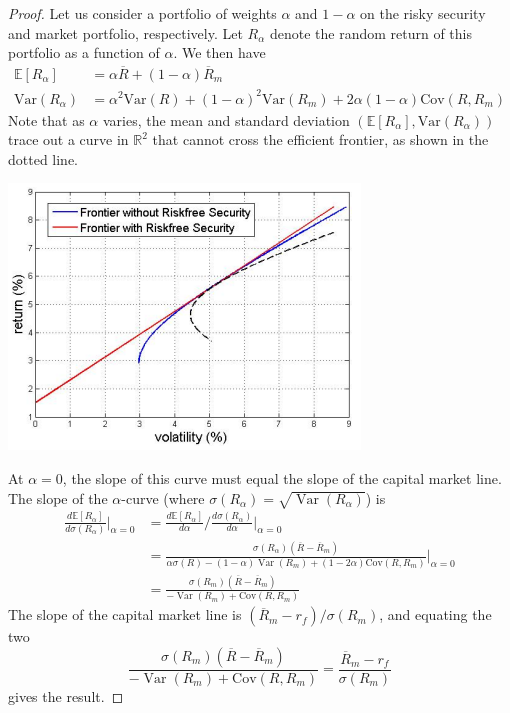 \documentclass{article}
\DeclareMathOperator{\Var}{Var}
\begin{document}
    \begin{proof}
      Let us consider a portfolio of weights $\alpha$ and $1 - \alpha$ on the risky security and market portfolio, respectively. Let $R_\alpha$ denote the random return of this portfolio as a function of $\alpha$. We then have 
      \begin{align*}
          \mathbb{E}[R_\alpha] & = \alpha \overline{R} + (1 - \alpha) \overline{R}_m \\
          \mathrm{Var}(R_\alpha) & = \alpha^2 \mathrm{Var}(R) + (1 - \alpha)^2 \mathrm{Var}(R_m) + 2 \alpha (1 - \alpha) \mathrm{Cov}(R, R_m)
      \end{align*}
      Note that as $\alpha$ varies, the mean and standard deviation $(\mathbb{E}[R_\alpha], \mathrm{Var}(R_\alpha))$ trace out a curve in $\mathbb{R}^2$ that cannot cross the efficient frontier, as shown in the dotted line. 
      \begin{center}
          \includegraphics[scale=0.5]{img/CAPM.png}
      \end{center}
      At $\alpha = 0$, the slope of this curve must equal the slope of the capital market line. The slope of the $\alpha$-curve (where $\sigma(R_\alpha) = \sqrt{\Var(R_\alpha)}$) is 
      \begin{align*}
          \frac{d \mathbb{E}[R_{\alpha}]}{d \sigma(R_\alpha)} \bigg|_{\alpha = 0} & = \frac{d\mathbb{E}[R_\alpha]}{d \alpha} \bigg/ \frac{d \sigma(R_\alpha)}{d \alpha} \bigg|_{\alpha = 0} \\
          & = \frac{\sigma(R_\alpha) (\overline{R} - \overline{R}_m)}{\alpha \sigma(R) - (1 - \alpha) \Var (R_m) + (1 - 2 \alpha) \mathrm{Cov}(R, R_m)} \bigg|_{\alpha = 0} \\
          & = \frac{\sigma(R_m) (\overline{R} - \overline{R}_m)}{-\Var(R_m) + \mathrm{Cov}(R, R_m)}
      \end{align*}
      The slope of the capital market line is $(\overline{R}_m - r_f) / \sigma(R_m)$, and equating the two 
      \begin{equation}
        \frac{\sigma(R_m) (\overline{R} - \overline{R}_m)}{-\Var(R_m) + \mathrm{Cov}(R, R_m)} = \frac{\overline{R}_m - r_f}{\sigma(R_m)}
      \end{equation}
      gives the result. 
    \end{proof}
\end{document}
